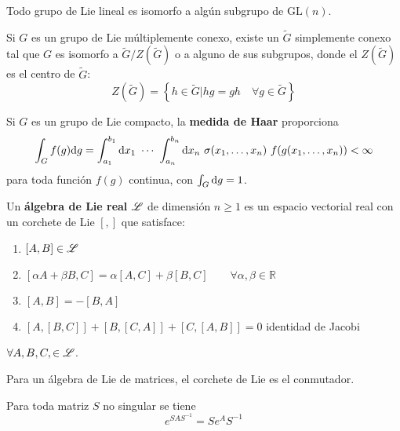 \begin{remark}
Todo grupo de Lie lineal es isomorfo a algún subgrupo de $\mathrm{GL}(n)$.
\end{remark}

\begin{definicion}
Si $G$ es un grupo de Lie múltiplemente conexo, existe un $\tilde{G}$ simplemente conexo tal que $G$ es isomorfo a $\tilde{G}/Z(\tilde{G})$ o a alguno de sus subgrupos, donde el $Z(\tilde{G})$ es el centro de $\tilde{G}$:
\begin{equation}
Z(\tilde{G})=\left\{h\in \tilde{G}| hg=gh\quad  \forall g\in \tilde{G}\right\}
\end{equation}
\end{definicion}



\begin{teorema}
Si $G$ es un grupo de Lie compacto, la \textbf{medida de Haar} proporciona
\begin{equation}
\int_G f(g)\mathrm{d} g=\int_{a_1}^{b_1}\mathrm{d} x_1\ \cdots\ \int_{a_n}^{b_n}\mathrm{d} x_n\ \sigma (x_1,\ldots,x_n)\ f(g(x_1,\ldots,x_n))<\infty
\end{equation}
para toda función $f(g)$ continua, con $\int_G\mathrm{d} g=1$.
\end{teorema}

\begin{definicion}
Un \textbf{álgebra de Lie real} $\mathscr{L}$ de dimensión $n\geq 1$ es un espacio vectorial real con un corchete de Lie $[,]$ que satisface:
\begin{enumerate}[label=\roman*)]
\item $[A,B]\in \mathscr{L}$
\item $[\alpha A+\beta B,C]=\alpha [A,C]+\beta [B,C]\qquad \forall\alpha,\beta \in \mathbb{R}$
\item $[A,B]=-[B,A]$
\item $[A,[B,C]]+[B,[C,A]]+[C,[A,B]]=0$ identidad de Jacobi
\end{enumerate} 
$\forall A,B,C,\in \mathscr{L}$.\medskip

Para un álgebra de Lie de matrices, el corchete de Lie es el conmutador.
\end{definicion}


\begin{remark}
Para toda matriz $S$ no singular se tiene
\begin{equation}
e^{SAS^{-1}}=Se^AS^{-1}
\end{equation}
\end{remark}

